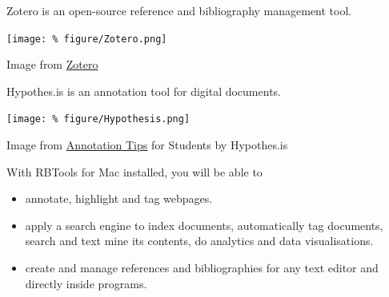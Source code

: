 \documentclass[unknownkeysallowed,usepdftitle=false, parskip=full]{beamer}
\newcommand{\secvariable}{nothing}
\newcommand{\mysection}[1]{\renewcommand{\secvariable}{#1}
}
\begin{document}
\mysection{slab}
\begin{frame}\label{\secvariable}

Zotero is an open-source reference and bibliography management tool.
  \vspace{0.5cm}

\texttt{[image: \%
figure/Zotero.png]}

Image from \href{https://www.zotero.org/}{Zotero}


\end{frame}





\mysection{minor}
\begin{frame}\label{\secvariable} %

Hypothes.is is an annotation tool for digital documents.
  \vspace{0.5cm}

\texttt{[image: \%
figure/Hypothesis.png]}

Image from \href{https://web.hypothes.is/annotation-tips-for-students/}{Annotation Tips} for Students by Hypothes.is 

\end{frame}

\mysection{conclusion}
\begin{frame}\label{\secvariable}
  
With RBTools for Mac installed, you will be able to  
  \begin{itemize}
   \item annotate, highlight and tag webpages. 
  \item apply a search engine to index documents, automatically tag documents, search and text mine its contents, do analytics and data visualisations.
  \item create and manage references and bibliographies for any text editor and directly inside programs.

  \end{itemize}

\end{frame}
\end{document}
